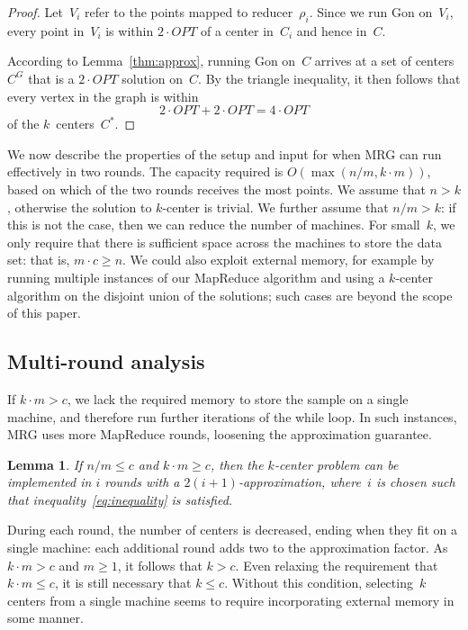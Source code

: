 \documentclass[11pt]{article}
\newtheorem{lemma}[theorem]{Lemma}
\newcommand{\ours}{{\sc MRG}\xspace}
\newcommand{\gon}{{\sc Gon}\xspace}
\newcommand{\OPT}{\ensuremath{\mathit{OPT}}}
\begin{document}
\begin{proof}
Let~$V_i$ refer to the points mapped to reducer~$\rho_i$.
Since we run \gon on~$V_i$, every point in~$V_i$ is within
$2\cdot\OPT$ of a center in~$C_i$ and hence in~$C$.

According to Lemma~\ref{thm:approx},
running \gon on~$C$ arrives at a set of centers~$C^G$
that is a $2\cdot\OPT$ solution on~$C$.
By the triangle inequality, it then follows that every vertex in the graph is
within $$2\cdot \OPT + 2\cdot \OPT = 4\cdot \OPT$$ of the $k$~centers~$C^*$.
\end{proof}

We now describe the properties of the setup and input for when \ours
can run effectively in two rounds.
The capacity required is $O(\max(n/m, k\cdot m))$,
based on which of the two rounds receives the most points. 
We assume that $n>k$, otherwise the solution to $k$-center is trivial.
We further assume that $n/ m > k$:
if this is not the case, then we can reduce
the number of machines.
For small~$k$, we only require that there is sufficient space across the machines to store the data set: 
that is, $m\cdot c \geq n$. 
We could also exploit external memory, for example by running multiple instances of our MapReduce algorithm and using a $k$-center
algorithm on the disjoint union of the solutions;
such cases are beyond the scope of this paper.

\subsection{Multi-round analysis}


If $k\cdot m> c$, we
lack the required memory to store the sample on a single machine, and therefore run further iterations of the while loop.  
In such instances, \ours uses more MapReduce rounds, loosening the approximation guarantee.


\begin{lemma}
\label{thm:mr_rounds}
If $n/ m \leq c$ and $k\cdot m\geq c$, then the $k$-center problem can be implemented in $i$ rounds with a $2(i+1)$-approximation, where~$i$ is chosen such that inequality~\ref{eq:inequality} is satisfied.
\end{lemma}

During each round, the number of centers is decreased, ending when they fit on a single machine:
each additional round adds two to the approximation factor.
As $k\cdot m> c$ and $m\geq 1$, it follows that $k>c$.
Even relaxing the requirement that $k\cdot m\leq c$, it is still necessary
that $k\leq c$.
Without this condition, selecting~$k$ centers
from a single machine seems to require incorporating external memory in some manner. 
\end{document}
